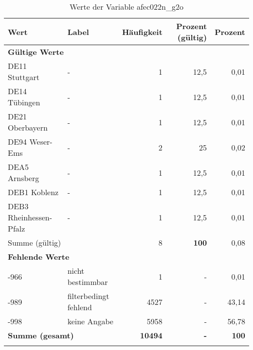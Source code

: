      \begin{longtable}{Xlrrr}
     \toprule
     \textbf{Wert} & \textbf{Label} & \textbf{Häufigkeit} & \textbf{Prozent (gültig)} & \textbf{Prozent} \\
     \endhead
     \midrule
     \multicolumn{5}{l}{\textbf{Gültige Werte}}\\

     \multicolumn{1}{X}{DE11 Stuttgart} &
     - &
     1 &
     12,5 &
     0,01 \\

     \multicolumn{1}{X}{DE14 Tübingen} &
     - &
     1 &
     12,5 &
     0,01 \\

     \multicolumn{1}{X}{DE21 Oberbayern} &
     - &
     1 &
     12,5 &
     0,01 \\

     \multicolumn{1}{X}{DE94 Weser-Ems} &
     - &
     2 &
     25 &
     0,02 \\

     \multicolumn{1}{X}{DEA5 Arnsberg} &
     - &
     1 &
     12,5 &
     0,01 \\

     \multicolumn{1}{X}{DEB1 Koblenz} &
     - &
     1 &
     12,5 &
     0,01 \\

     \multicolumn{1}{X}{DEB3 Rheinhessen-Pfalz} &
     - &
     1 &
     12,5 &
     0,01 \\
     \midrule
      \multicolumn{2}{l}{Summe (gültig)} & 8 &
      \textbf{100} &
         0,08 \\
     \multicolumn{5}{l}{\textbf{Fehlende Werte}}\\
       -966 & nicht bestimmbar & 1 & - & 0,01 \\

       -989 & filterbedingt fehlend & 4527 & - & 43,14 \\

       -998 & keine Angabe & 5958 & - & 56,78 \\

     \midrule
     \multicolumn{2}{l}{\textbf{Summe (gesamt)}} & \textbf{10494} & \textbf{-} & \textbf{100} \\
     \bottomrule
     \caption{Werte der Variable afec022n\_g2o}
     \end{longtable}
     
